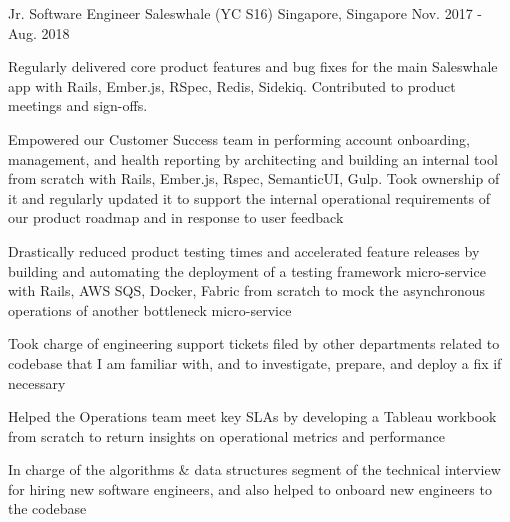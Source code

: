 \begin{cventries}
  \cventry
    {Jr. Software Engineer} %
    {Saleswhale (YC S16)} %
    {Singapore, Singapore} %
    {Nov. 2017 - Aug. 2018} %
    {
      \begin{cvitems} %
      \item { Regularly delivered core product features and bug fixes for the main Saleswhale app with Rails, Ember.js, RSpec, Redis, Sidekiq. Contributed to product meetings and sign-offs.}
      \item { Empowered our Customer Success team in performing account onboarding, management, and health reporting by architecting and building an internal tool from scratch with Rails, Ember.js, Rspec, SemanticUI, Gulp. Took ownership of it and regularly updated it to support the internal operational requirements of our product roadmap and in response to user feedback}
      \item { Drastically reduced product testing times and accelerated feature releases by building and automating the deployment of a testing framework micro-service with Rails, AWS SQS, Docker, Fabric from scratch to mock the asynchronous operations of another bottleneck micro-service}
      \item { Took charge of engineering support tickets filed by other departments related to codebase that I am familiar with, and to investigate, prepare, and deploy a fix if necessary}
      \item { Helped the Operations team meet key SLAs by developing a Tableau workbook from scratch to return insights on operational metrics and performance }
      \item { In charge of the algorithms \& data structures segment of the technical interview for hiring new software engineers, and also helped to onboard new engineers to the codebase}
      \end{cvitems}
    }



\end{cventries}
